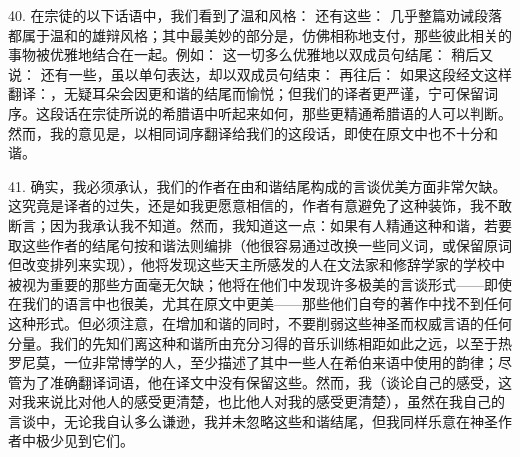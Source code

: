 40. 在宗徒的以下话语中，我们看到了温和风格：  还有这些：  几乎整篇劝诫段落都属于温和的雄辩风格；其中最美妙的部分是，仿佛相称地支付，那些彼此相关的事物被优雅地结合在一起。例如：  这一切多么优雅地以双成员句结尾： 稍后又说：  还有一些，虽以单句表达，却以双成员句结束： 再往后：  如果这段经文这样翻译：，无疑耳朵会因更和谐的结尾而愉悦；但我们的译者更严谨，宁可保留词序。这段话在宗徒所说的希腊语中听起来如何，那些更精通希腊语的人可以判断。然而，我的意见是，以相同词序翻译给我们的这段话，即使在原文中也不十分和谐。\par

41. 确实，我必须承认，我们的作者在由和谐结尾构成的言谈优美方面非常欠缺。这究竟是译者的过失，还是如我更愿意相信的，作者有意避免了这种装饰，我不敢断言；因为我承认我不知道。然而，我知道这一点：如果有人精通这种和谐，若要取这些作者的结尾句按和谐法则编排（他很容易通过改换一些同义词，或保留原词但改变排列来实现），他将发现这些天主所感发的人在文法家和修辞学家的学校中被视为重要的那些方面毫无欠缺；他将在他们中发现许多极美的言谈形式——即使在我们的语言中也很美，尤其在原文中更美——那些他们自夸的著作中找不到任何这种形式。但必须注意，在增加和谐的同时，不要削弱这些神圣而权威言语的任何分量。我们的先知们离这种和谐所由充分习得的音乐训练相距如此之远，以至于热罗尼莫，一位非常博学的人，至少描述了其中一些人在希伯来语中使用的韵律；尽管为了准确翻译词语，他在译文中没有保留这些。然而，我（谈论自己的感受，这对我来说比对他人的感受更清楚，也比他人对我的感受更清楚），虽然在我自己的言谈中，无论我自认多么谦逊，我并未忽略这些和谐结尾，但我同样乐意在神圣作者中极少见到它们。\par

